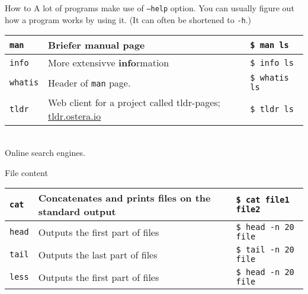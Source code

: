 \documentclass{beamer}
\let\tt\texttt
\let\bf\textbf
\begin{document}
\begin{frame}{How to}
        A lot of programs make use of \tt{--help} option. You can usually figure out how a program works by using it. (It can often be shortened to \tt{-h}.)
        \begin{tabular}{p{} p{} | p{}}
                \hline
                \tt{man}                    &
                Briefer \bf{man}ual page    &
                \tt{\$ man ls}              \\
                \hline
                \tt{info}                           &
                More extensivve \bf{info}rmation    &
                \tt{\$ info ls}                     \\
                \hline
                \tt{whatis}                         &
                Header of \tt{man} page.            &
                \tt{\$ whatis ls}                   \\
                \hline
                \tt{tldr}             &
                Web client for a project called tldr-pages; 
                \url{tldr.ostera.io} &
                \tt{\$ tldr ls}       \\
                \hline
        \end{tabular}   \\
        Online search engines.
\end{frame}

\begin{frame}{File content}
        \begin{tabular}{p{} p{} | p{}}
                \hline
                \tt{cat}             &
                Concatenates and prints files on the standard output &
                \tt{\$ cat file1 file2}       \\
                \hline
                \tt{head}             &
                Outputs the first part of files &
                \tt{\$ head -n 20 file}       \\
                \hline
                \tt{tail}             &
                Outputs the last part of files &
                \tt{\$ tail -n 20 file}       \\
                \hline
                \tt{less}             &
                Outputs the first part of files &
                \tt{\$ head -n 20 file}       \\
                \hline
        \end{tabular}  
\end{frame}
\end{document}
